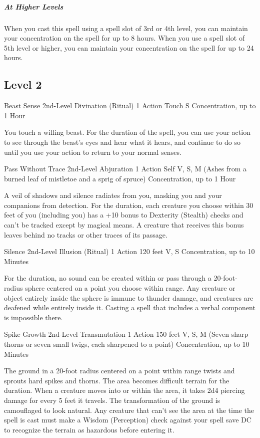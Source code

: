 {\subparagraph*{At Higher Levels} When you cast this spell using a spell slot of 3rd or 4th level, you can maintain your concentration on the spell for up to 8 hours. When you use a spell slot of 5th level or higher, you can maintain your concentration on the spell for up to 24 hours.

\subsection*{Level 2}
\DndSpellHeader
  {Beast Sense}
  {2nd-Level Divination (Ritual)}
  {1 Action}
  {Touch}
  {S}
  {Concentration, up to 1 Hour}

You touch a willing beast. For the duration of the spell, you can use your action to see through the beast’s eyes and hear what it hears, and continue to do so until you use your action to return to your normal senses.

\DndSpellHeader
  {Pass Without Trace}
  {2nd-Level Abjuration}
  {1 Action}
  {Self}
  {V, S, M (Ashes from a burned leaf of mistletoe and a sprig of spruce)}
  {Concentration, up to 1 Hour}

A veil of shadows and silence radiates from you, masking you and your companions from detection. For the duration, each creature you choose within 30 feet of you (including you) has a +10 bonus to Dexterity (Stealth) checks and can't be tracked except by magical means. A creature that receives this bonus leaves behind no tracks or other traces of its passage.

\DndSpellHeader
  {Silence}
  {2nd-Level Illusion (Ritual)}
  {1 Action}
  {120 feet}
  {V, S}
  {Concentration, up to 10 Minutes}

For the duration, no sound can be created within or pass through a 20-foot-radius sphere centered on a point you choose within range. Any creature or object entirely inside the sphere is immune to thunder damage, and creatures are deafened while entirely inside it. Casting a spell that includes a verbal component is impossible there.

\DndSpellHeader
  {Spike Growth}
  {2nd-Level Transmutation}
  {1 Action}
  {150 feet}
  {V, S, M (Seven sharp thorns or seven small twigs, each sharpened to a point)}
  {Concentration, up to 10 Minutes}

The ground in a 20-foot radius centered on a point within range twists and sprouts hard spikes and thorns. The area becomes difficult terrain for the duration. When a creature moves into or within the area, it takes 2d4 piercing damage for every 5 feet it travels.
The transformation of the ground is camouflaged to look natural. Any creature that can’t see the area at the time the spell is cast must make a Wisdom (Perception) check against your spell save DC to recognize the terrain as hazardous before entering it.

}
